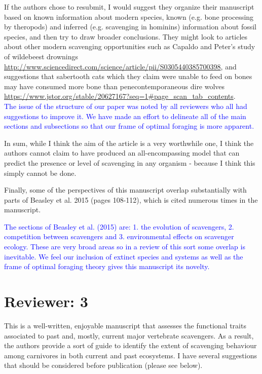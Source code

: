 \documentclass[12pt,letterpaper]{article}
\begin{document}
If the authors chose to resubmit, I would suggest they organize their manuscript based on known information about modern species, known (e.g. bone processing by theropods) and inferred (e.g. scavenging in hominins) information about fossil species, and then try to draw broader conclusions.
They might look to articles about other modern scavenging opportunities such as Capaldo and Peter's study of wildebeest drownings \url{http://www.sciencedirect.com/science/article/pii/S0305440385700398}, and suggestions that sabertooth cats which they claim were unable to feed on bones may have consumed more bone than penecontemporaneous dire wolves \url{https://www.jstor.org/stable/20627167?seq=1#page_scan_tab_contents}. \\
\smallskip
\textcolor{blue}{The issue of the structure of our paper was noted by all reviewers who all had suggestions to improve it. 
We have made an effort to delineate all of the main sections and subsections so that our frame of optimal foraging is more apparent.}

\smallskip
In sum, while I think the aim of the article is a very worthwhile one, I think the authors cannot claim to have produced an all-encompassing model that can predict the presence or level of scavenging in any organism - because I think this simply cannot be done.


Finally, some of the perspectives of this manuscript overlap substantially with parts of Beasley et al. 2015 (pages 108-112), which is cited numerous times in the manuscript.
\smallskip

\textcolor{blue}{The sections of Beasley et al. (2015) are: 1. the evolution of scavengers, 2. competition between scavengers and 3. environmental effects on scavenger ecology.
These are very broad areas so in a review of this sort some overlap is inevitable.
We feel our inclusion of extinct species and systems as well as the frame of optimal foraging theory gives this manuscript its novelty.} 
\smallskip

\section{Reviewer: 3}
This is a well-written, enjoyable manuscript that assesses the functional traits associated to past and, mostly, current major vertebrate scavengers.
As a result, the authors provide a sort of guide to identify the extent of scavenging behaviour among carnivores in both current and past ecosystems.
I have several suggestions that should be considered before publication (please see below).
\end{document}

